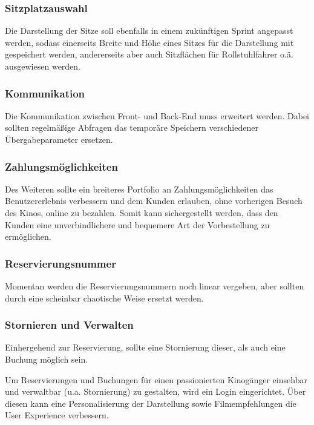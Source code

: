\subsubsection*{Sitzplatzauswahl}
\label{ssssec:sitzplatzauswahl}
Die Darstellung der Sitze soll ebenfalls in einem zukünftigen Sprint angepasst werden, sodass einerseits Breite und Höhe eines Sitzes für die Darstellung mit gespeichert werden, andererseits aber auch Sitzflächen für Rollstuhlfahrer o.ä. ausgewiesen werden.

\subsubsection*{Kommunikation}
\label{ssssec:kommunikation}
Die Kommunikation zwischen Front- und Back-End muss erweitert werden.
Dabei sollten regelmäßige Abfragen das temporäre Speichern verschiedener Übergabeparameter ersetzen.

\subsubsection*{Zahlungsmöglichkeiten}
\label{ssssec:zahlungsmöglichkeiten}
Des Weiteren sollte ein breiteres Portfolio an Zahlungsmöglichkeiten das Benutzererlebnis verbessern und dem Kunden erlauben, ohne vorherigen Besuch des Kinos, online zu bezahlen.
Somit kann sichergestellt werden, dass den Kunden eine unverbindlichere und bequemere Art der Vorbestellung zu ermöglichen.

\subsubsection*{Reservierungsnummer}
\label{ssssec:reservierungsnummer}
Momentan werden die Reservierungsnummern noch linear vergeben, aber sollten durch eine scheinbar chaotische Weise ersetzt werden.

\subsubsection*{Stornieren und Verwalten}
\label{ssssec:stornieren_und_verwalten}
Einhergehend zur Reservierung, sollte eine Stornierung dieser, als auch eine Buchung möglich sein.

Um Reservierungen und Buchungen für einen passionierten Kinogänger einsehbar und verwaltbar (u.a. Stornierung) zu gestalten, wird ein Login eingerichtet.
Über diesen kann eine Personalisierung der Darstellung sowie Filmempfehlungen die User Experience verbessern.


